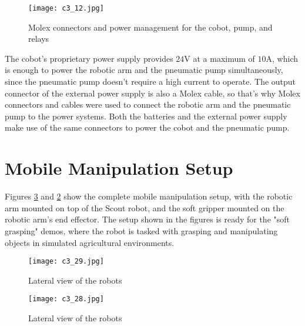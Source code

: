\begin{figure}[t]
    \centering
    \texttt{[image: c3\_12.jpg]}
    \captionsetup{width=1\linewidth}
    \caption{Molex connectors and power management for the cobot, pump, and relays}
    \label{fig:c3_img12}
\end{figure}

The cobot's proprietary power supply provides $24$V at a maximum of $10$A, which is enough to power the robotic arm
and the pneumatic pump simultaneously, since the pneumatic pump doesn't require a high current to operate.
The output connector of the external power supply is also a Molex cable, so that's why Molex connectors and cables
were used to connect the robotic arm and the pneumatic pump to the power systems. Both the batteries and the 
external power supply make use of the same connectors to power the cobot and the pneumatic pump.



\section{Mobile Manipulation Setup}

Figures \ref{fig:c3_img28} and \ref{fig:c3_img29} show the complete mobile manipulation setup, with the robotic arm
mounted on top of the Scout robot, and the soft gripper mounted on the robotic arm's end effector.
The setup shown in the figures is ready for the "soft grasping" demos, where the robot is tasked with grasping
and manipulating objects in simulated agricultural environments.

\begin{figure}[t]
    \centering
    \texttt{[image: c3\_29.jpg]}
    \captionsetup{width=1\linewidth}
    \caption{Lateral view of the robots}
    \label{fig:c3_img29}
\end{figure}

\begin{figure}[t]
    \centering
    \texttt{[image: c3\_28.jpg]}
    \captionsetup{width=1\linewidth}
    \caption{Lateral view of the robots}
    \label{fig:c3_img28}
\end{figure}